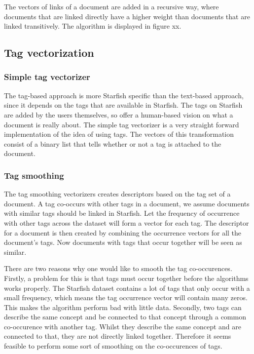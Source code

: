 The vectors of links of a document are added in a recursive way, where documents that are linked directly have a higher weight than documents that are linked transitively. The algorithm is displayed in figure xx.

\subsection{Tag vectorization}
\subsubsection{Simple tag vectorizer}
The tag-based approach is more Starfish specific than the text-based approach, since it depends on the tags that are available in Starfish. The tags on Starfish are added by the users themselves, so offer a human-based vision on what a document is really about. The simple tag vectorizer is a very straight forward implementation of the idea of using tags. The vectors of this transformation consist of a binary list that tells whether or not a tag is attached to the document. 

\subsubsection{Tag smoothing}
The tag smoothing vectorizers creates descriptors based on the tag set of a document. A tag co-occurs with other tags in a document, we assume documents with similar tags should be linked in Starfish. Let the frequency of occurrence with other tags across the dataset will form a vector for each tag. The descriptor for a document is then created by combining the occurrence vectors for all the document's tags. Now documents with tags that occur together will be seen as similar.

There are two reasons why one would like to smooth the tag co-occurences. Firstly, a problem for this is that tags must occur together before the algorithms works properly. The Starfish dataset contains a lot of tags that only occur with a small frequency, which means the tag occurrence vector will contain many zeros. This makes the algorithm perform bad with little data. Secondly, two tags can describe the same concept and be connected to that concept through a common co-occurence with another tag. Whilst they describe the same concept and are connected to that, they are not directly linked together. Therefore it seems feasible to perform some sort of smoothing on the co-occurences of tags.

